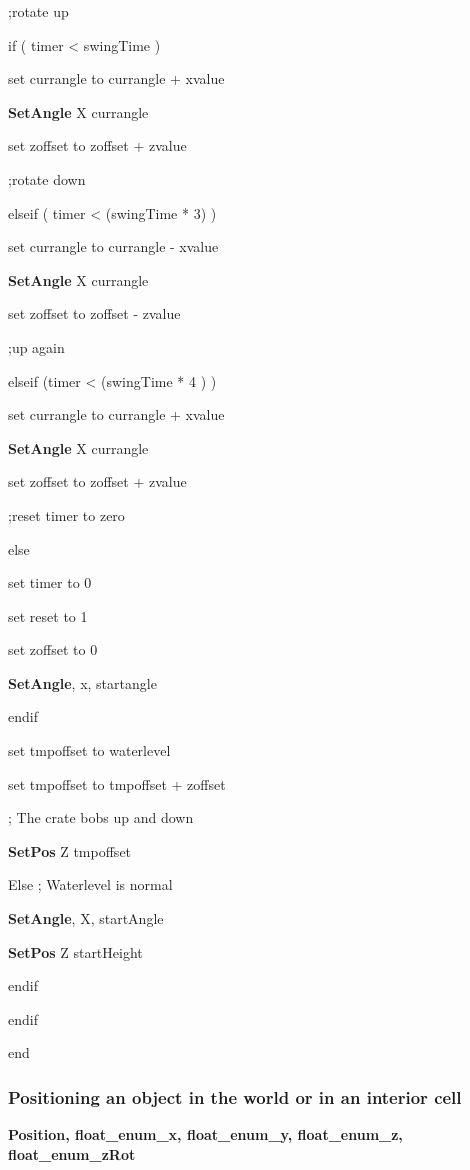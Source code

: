 \documentclass[
]{article}
\begin{document}
;rotate up

if ( timer \textless{} swingTime )

set currangle to currangle + xvalue

\textbf{SetAngle} X currangle

set zoffset to zoffset + zvalue

;rotate down

elseif ( timer \textless{} (swingTime * 3) )

set currangle to currangle - xvalue

\textbf{SetAngle} X currangle

set zoffset to zoffset - zvalue

;up again

elseif (timer \textless{} (swingTime * 4 ) )

set currangle to currangle + xvalue

\textbf{SetAngle} X currangle

set zoffset to zoffset + zvalue

;reset timer to zero

else

set timer to 0

set reset to 1

set zoffset to 0

\textbf{SetAngle}, x, startangle

endif

set tmpoffset to waterlevel

set tmpoffset to tmpoffset + zoffset

; The crate bobs up and down

\textbf{SetPos} Z tmpoffset

Else ; Waterlevel is normal

\textbf{SetAngle}, X, startAngle

\textbf{SetPos} Z startHeight

endif

endif

end

\hypertarget{positioning-an-object-in-the-world-or-in-an-interior-cell}{%
\subsubsection{Positioning an object in the world or in an interior
cell}\label{positioning-an-object-in-the-world-or-in-an-interior-cell}}

\textbf{Position, float\_enum\_x, float\_enum\_y, float\_enum\_z,
float\_enum\_zRot}
\end{document}
